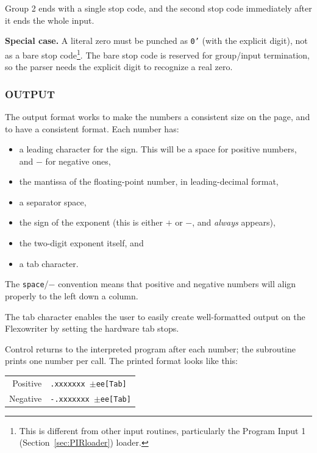 \vspace{1em}
Group 2 ends with a single stop code, and the second stop code immediately after it ends the whole input.

\medskip
\textbf{Special case.} A literal zero must be punched as \texttt{0'} (with the explicit digit), not as a bare stop code\footnote{This is different from other input routines, particularly the Program Input 1 (Section~\ref{sec:PIRloader}) loader.}. The bare stop code is reserved for group/input termination, so the parser needs the explicit digit to recognize a real zero.

\subsubsection*{OUTPUT}
The output format works to make the numbers a consistent size on the page, and to have a consistent format. Each number has:
\begin{itemize}
	\item a leading character for the sign. This will be a space for positive numbers, and $-$ for negative ones,
	\item the mantissa of the floating-point number, in leading-decimal format,
	\item a separator space,
	\item the sign of the exponent (this is either $+$ or $-$, and \emph{always} appears),
	\item the two-digit exponent itself, and
	\item a tab character.
\end{itemize}

The \texttt{space}/$-$ convention means that positive and negative numbers will align properly to the left down a column.

The tab character enables the user to easily create well-formatted output on the Flexowriter by setting the hardware tab stops.

Control returns to the interpreted program after each number; the subroutine prints one number per call. The printed format looks like this:

\begin{center}
\small
\begin{tabular}{rl}
Positive&\texttt{\phantom{-}.xxxxxxx\ $\pm$ee[Tab]} \\
Negative&\texttt{-.xxxxxxx\ $\pm$ee[Tab]} \\
\end{tabular}
\end{center}

